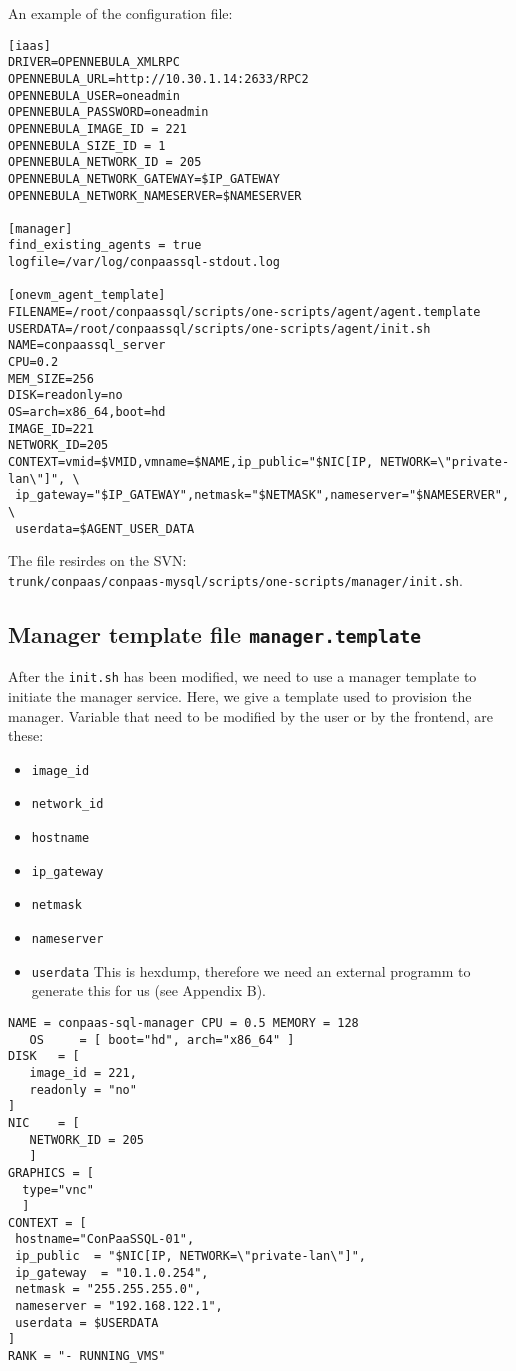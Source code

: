 \documentclass[a4paper,10pt]{article}
\begin{document}
An example of the configuration file:

\begin{Verbatim}[frame=single]
[iaas]
DRIVER=OPENNEBULA_XMLRPC
OPENNEBULA_URL=http://10.30.1.14:2633/RPC2
OPENNEBULA_USER=oneadmin
OPENNEBULA_PASSWORD=oneadmin
OPENNEBULA_IMAGE_ID = 221
OPENNEBULA_SIZE_ID = 1
OPENNEBULA_NETWORK_ID = 205
OPENNEBULA_NETWORK_GATEWAY=$IP_GATEWAY
OPENNEBULA_NETWORK_NAMESERVER=$NAMESERVER

[manager]
find_existing_agents = true
logfile=/var/log/conpaassql-stdout.log

[onevm_agent_template]
FILENAME=/root/conpaassql/scripts/one-scripts/agent/agent.template
USERDATA=/root/conpaassql/scripts/one-scripts/agent/init.sh
NAME=conpaassql_server
CPU=0.2
MEM_SIZE=256
DISK=readonly=no
OS=arch=x86_64,boot=hd
IMAGE_ID=221
NETWORK_ID=205
CONTEXT=vmid=$VMID,vmname=$NAME,ip_public="$NIC[IP, NETWORK=\"private-lan\"]", \
 ip_gateway="$IP_GATEWAY",netmask="$NETMASK",nameserver="$NAMESERVER", \
 userdata=$AGENT_USER_DATA
\end{Verbatim}

The file resirdes on the SVN: \\ {\tt trunk/conpaas/conpaas-mysql/scripts/one-scripts/manager/init.sh}. 

\subsection{Manager template file {\tt manager.template}}

After the {\tt init.sh} has been modified, we need to use a manager template to initiate the manager service. Here, we give a template used to provision the manager. Variable that need to be modified by the user or by the frontend, are these:

\begin{itemize}
	\item {\tt image\_id}
	\item {\tt network\_id}	
	\item {\tt hostname}		
	\item {\tt ip\_gateway}			
	\item {\tt netmask}			
	\item {\tt nameserver}
	\item {\tt userdata} This is hexdump, therefore we need an external programm to generate this for us (see Appendix B).
\end{itemize}

\begin{Verbatim}[frame=single]
NAME = conpaas-sql-manager CPU = 0.5 MEMORY = 128
   OS     = [ boot="hd", arch="x86_64" ]
DISK   = [
   image_id = 221,
   readonly = "no"
]
NIC    = [ 
   NETWORK_ID = 205
   ]
GRAPHICS = [
  type="vnc"  
  ]
CONTEXT = [
 hostname="ConPaaSSQL-01",
 ip_public  = "$NIC[IP, NETWORK=\"private-lan\"]",
 ip_gateway  = "10.1.0.254",
 netmask = "255.255.255.0",
 nameserver = "192.168.122.1",
 userdata = $USERDATA
]
RANK = "- RUNNING_VMS"
\end{Verbatim}
\end{document}
